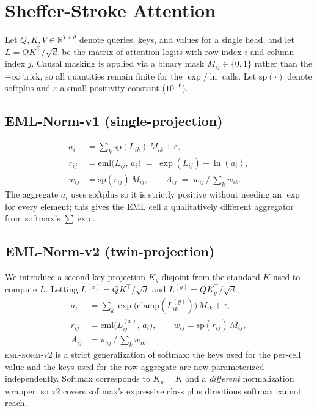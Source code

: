 \documentclass{article}
\begin{document}
\section{Sheffer-Stroke Attention}

Let $Q, K, V \in \mathbb{R}^{T \times d}$ denote queries, keys, and
values for a single head, and let $L = QK^\top / \sqrt{d}$ be the matrix
of attention logits with row index $i$ and column index $j$. Causal
masking is applied via a binary mask $M_{ij} \in \{0, 1\}$ rather than the
$-\infty$ trick, so all quantities remain finite for the $\exp$/$\ln$
calls. Let $\mathrm{sp}(\cdot)$ denote $\mathrm{softplus}$ and $\varepsilon$
a small positivity constant ($10^{-6}$).

\subsection{EML-Norm-v1 (single-projection)}
\begin{align}
  a_i           &= \textstyle\sum_k \mathrm{sp}(L_{ik})\,M_{ik} + \varepsilon, \\
  r_{ij}        &= \mathrm{eml}\bigl(L_{ij},\,a_i\bigr) \;=\; \exp(L_{ij}) - \ln(a_i), \\
  w_{ij}        &= \mathrm{sp}(r_{ij})\,M_{ij}, \qquad
  A_{ij}        \;=\; w_{ij} \,\big/\, \textstyle\sum_k w_{ik}.
\end{align}
The aggregate $a_i$ uses $\mathrm{softplus}$ so it is strictly positive
without needing an $\exp$ for every element; this gives the EML cell a
qualitatively different aggregator from softmax's $\sum \exp$.

\subsection{EML-Norm-v2 (twin-projection)}
We introduce a second key projection $K_y$ disjoint from the standard $K$
used to compute $L$. Letting $L^{(x)} = QK^\top/\sqrt{d}$ and
$L^{(y)} = QK_y^\top/\sqrt{d}$,
\begin{align}
  a_i     &= \textstyle\sum_k \exp\bigl(\mathrm{clamp}(L^{(y)}_{ik})\bigr)\,M_{ik} + \varepsilon, \\
  r_{ij}  &= \mathrm{eml}\bigl(L^{(x)}_{ij},\,a_i\bigr), \qquad
  w_{ij}   = \mathrm{sp}(r_{ij})\,M_{ij}, \\
  A_{ij}  &= w_{ij} \,\big/\, \textstyle\sum_k w_{ik}.
\end{align}
\textsc{eml-norm-v2} is a strict generalization of softmax: the keys used
for the per-cell value and the keys used for the row aggregate are now
parameterized independently. Softmax corresponds to $K_y = K$ and a
\emph{different} normalization wrapper, so v2 covers softmax's expressive
class plus directions softmax cannot reach.
\end{document}
